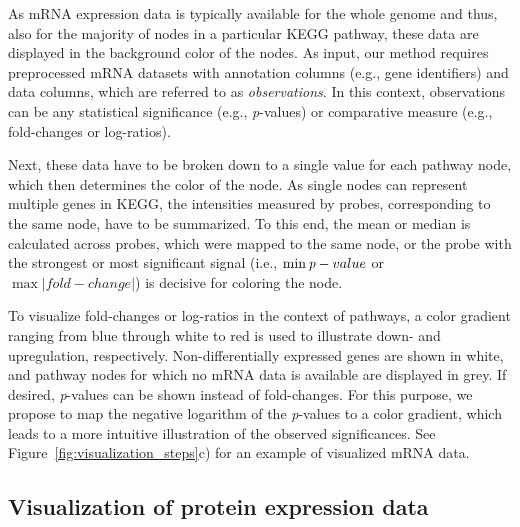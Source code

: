 \documentclass{bioinfo}
\begin{document}
As mRNA expression data is typically available for the whole genome and thus, also for the majority
of nodes in a particular KEGG pathway, these data are displayed in the background color of the
nodes.
%
As input, our method requires preprocessed mRNA datasets with annotation columns (e.g.,
gene identifiers) and data columns, which are referred to as \emph{observations}. In this context,
observations can be any statistical significance (e.g., \emph{p}-values) or comparative measure
(e.g., fold-changes or log-ratios).

Next, these data have to be broken down to a single value for each pathway node, which then
determines the color of the node. As single nodes can represent multiple genes in KEGG, the
intensities measured by probes, corresponding to the same node, have to be summarized. To this end,
the mean or median is calculated across probes, which were mapped to the same node, or the probe
with the strongest or most significant signal (i.e., $\min\emph{p}-value$ or $\max|fold-change|$) is
decisive for coloring the node.

To visualize fold-changes or log-ratios in the context of pathways, a color gradient ranging from
blue through white to red is used to illustrate down- and upregulation, respectively. Non-differentially expressed
genes are shown in white, and pathway nodes for which no mRNA data is available are displayed in
grey. If desired, \emph{p}-values can be shown instead of fold-changes. For this purpose, we propose
to map the negative logarithm of the \emph{p}-values to a color gradient, which leads to a more
intuitive illustration of the observed significances.
See Figure~\ref{fig:visualization_steps}c) for an example of visualized mRNA data.


\subsection{Visualization of protein expression data}
\end{document}
